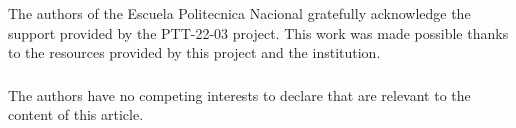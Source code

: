 \documentclass[runningheads]{llncs}
\begin{document}
\begin{credits}
\subsubsection{\ackname} The authors of the Escuela Politecnica Nacional gratefully acknowledge the support provided by the PTT-22-03 project. This work was made possible thanks to the resources provided by this project and the institution.


\subsubsection{\discintname}
 The authors have no competing interests to declare that are
relevant to the content of this article.
\end{credits}
%
%
%
% 
% 
%


\end{document}
